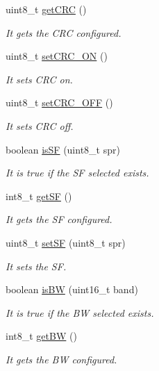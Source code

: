 \begin{DoxyCompactItemize}
uint8\+\_\+t \hyperlink{class_wasp_s_x1272_a203b6de1df24b6c2d3d6707c1106ffb4}{get\+C\+RC} ()
\begin{DoxyCompactList}\small\item\em It gets the C\+RC configured. \end{DoxyCompactList}\item 
uint8\+\_\+t \hyperlink{class_wasp_s_x1272_a198b1a5e1541db62325abd50d01bd9bd}{set\+C\+R\+C\+\_\+\+ON} ()
\begin{DoxyCompactList}\small\item\em It sets C\+RC on. \end{DoxyCompactList}\item 
uint8\+\_\+t \hyperlink{class_wasp_s_x1272_a26eeb852f94a25a2ba634d9cf392004c}{set\+C\+R\+C\+\_\+\+O\+FF} ()
\begin{DoxyCompactList}\small\item\em It sets C\+RC off. \end{DoxyCompactList}\item 
boolean \hyperlink{class_wasp_s_x1272_ac03cb7d689229081f0abc07bca8973ba}{is\+SF} (uint8\+\_\+t spr)
\begin{DoxyCompactList}\small\item\em It is true if the SF selected exists. \end{DoxyCompactList}\item 
int8\+\_\+t \hyperlink{class_wasp_s_x1272_a74458c9b8d7c6779d990fbccef44030e}{get\+SF} ()
\begin{DoxyCompactList}\small\item\em It gets the SF configured. \end{DoxyCompactList}\item 
uint8\+\_\+t \hyperlink{class_wasp_s_x1272_a6274034f0824ca27d5dccdbcfbd30361}{set\+SF} (uint8\+\_\+t spr)
\begin{DoxyCompactList}\small\item\em It sets the SF. \end{DoxyCompactList}\item 
boolean \hyperlink{class_wasp_s_x1272_ae8bb6b458f0332ad246e4d31ccb249ff}{is\+BW} (uint16\+\_\+t band)
\begin{DoxyCompactList}\small\item\em It is true if the BW selected exists. \end{DoxyCompactList}\item 
int8\+\_\+t \hyperlink{class_wasp_s_x1272_a60da4a67007c36b712fcdc8f53880fdb}{get\+BW} ()
\begin{DoxyCompactList}\small\item\em It gets the BW configured. \end{DoxyCompactList}\item 

\end{DoxyCompactItemize}
